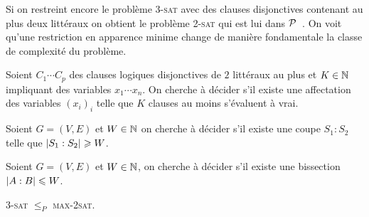 \documentclass{standalone}
\begin{document}
\begin{rem}
	Si on restreint encore le problème \textsc{3-sat} avec des clauses disjonctives contenant au plus deux littéraux on obtient le problème \textsc{2-sat} qui est lui dans $\mathcal{P}$~\cite{sat}. On voit qu'une restriction en apparence minime change de manière fondamentale la classe de complexité du problème.
\end{rem}

\begin{defn}
	Soient $C_1 \cdots C_p$ des clauses logiques disjonctives de $2$ littéraux au plus et $K\in \mathbb{N}$ impliquant des variables $x_1 \cdots x_n$. On cherche à décider s'il existe une affectation des variables $(x_i)_i$ telle que $K$ clauses au moins s'évaluent à vrai.
\end{defn}

\begin{defn}
	Soient $G=(V,E)$ et $W \in \mathbb{N}$ on cherche à décider s'il existe une coupe $S_1:S_2$ telle que $\left| S_1:S_2\right| \geqslant W$.	
\end{defn}

\begin{defn}
	Soient $G=(V, E)$ et $W \in \mathbb{N}$, on cherche à décider s'il existe une bissection $\left| A:B\right| \leqslant W$.
\end{defn}

\begin{thm}
	 \textsc{3-sat} $\leq_P$ \textsc{max-2sat}.
\end{thm}
\end{document}
